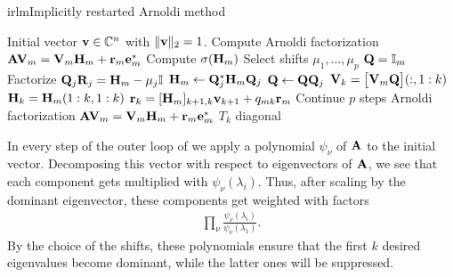 \begin{Algorithm*}{irlm}{Implicitly restarted Arnoldi method}
  \begin{algorithmic}[1]
    \Require Initial vector $\mathbf v\in\mathbb C^n$ with $\lVert\mathbf v\rVert_2=1$.
    \State Compute Arnoldi factorization
    $\mathbf A\mathbf V_m = \mathbf V_m\mathbf H_m + \mathbf r_m\mathbf e_m^*$
    \Repeat
    \State Compute $\sigma(\mathbf H_m)$
    \State Select shifts $\mu_1,\dots,\mu_p$
    \State $\mathbf Q = \mathbb I_m$
    \State Factorize $\mathbf Q_j\mathbf R_j = \mathbf H_m - \mu_j\mathbb I$
    \State $\mathbf H_m \gets \mathbf Q_j^*\mathbf H_m\mathbf Q_j$
    \State $\mathbf Q \gets \mathbf Q\mathbf Q_j$
    \EndFor
    \State $\mathbf V_k = \bigl[\mathbf V_m\mathbf Q\bigr](:,1:k)$
    \State $\mathbf H_k = \mathbf H_m(1:k,1:k)$
    \State $\mathbf r_k= [\mathbf H_m]_{k+1,k}\mathbf v_{k+1} + q_{mk}\mathbf r_m$
    \State Continue $p$ steps Arnoldi factorization
    $\mathbf A\mathbf V_m = \mathbf V_m\mathbf H_m + \mathbf r_m\mathbf e_m^*$
    \Until $T_k$ diagonal
  \end{algorithmic}
\end{Algorithm*}

\begin{remark}
  In every step of the outer loop of  we
  apply a polynomial $\psi_\nu$ of $\mathbf A$ to the initial
  vector. Decomposing this vector with respect to eigenvectors of
  $\mathbf A$, we see that each component gets multiplied with
  $\psi_\nu(\lambda_i)$. Thus, after scaling by the dominant
  eigenvector, these components get weighted with factors
  \begin{gather}
    \prod_\nu\frac{\psi_\nu(\lambda_i)}{\psi_\nu(\lambda_1)}.
  \end{gather}
  By the choice of the shifts, these polynomials ensure that the first
  $k$ desired eigenvalues become dominant, while the latter ones will
  be suppressed.
\end{remark}

